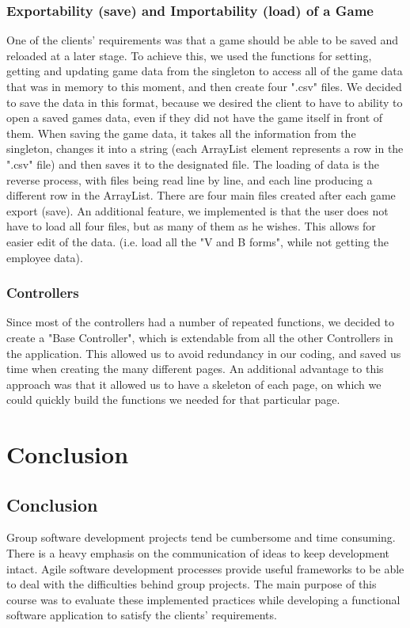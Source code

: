 \documentclass{l3proj}
\begin{document}
\subsubsection{Exportability (save) and Importability (load) of a Game}
One of the clients' requirements was that a game should be able to be saved and reloaded at a later stage. To achieve this, we used the functions for setting, getting and updating game data from the singleton to access all of the game data that was in memory to this moment, and then create four ".csv" files. We decided to save the data in this format, because we desired the client to have to ability to open a saved games data, even if they did not have the game itself in front of them. 
When saving the game data, it takes all the information from the singleton, changes it into a string (each ArrayList element represents a row in the ".csv" file) and then saves it to the designated file. The loading of data is the reverse process, with files being read line by line, and each line producing a different row in the ArrayList. There are four main files created after each game export (save). An additional feature, we implemented is that the user does not have to load all four files, but as many of them as he wishes. This allows for easier edit of the data. (i.e. load all the "V and B forms", while not getting the employee data).

\subsubsection{Controllers}
Since most of the controllers had a number of repeated functions, we decided to create a "Base Controller", which is extendable from all the other Controllers in the application. This allowed us to avoid redundancy in our coding, and saved us time when creating the many different pages. An additional advantage to this approach was that it allowed us to have a skeleton of each page, on which we could quickly build the functions we needed for that particular page.

\section{Conclusion}
\label{sec:conclusion}
\subsection{Conclusion}
Group software development projects tend be cumbersome and time consuming. There is a heavy emphasis on the communication of ideas to keep development intact. Agile software development processes provide useful frameworks to be able to deal with the difficulties behind group projects. The main purpose of this course was to evaluate these implemented practices while developing a functional software application to satisfy the clients' requirements.
\end{document}

